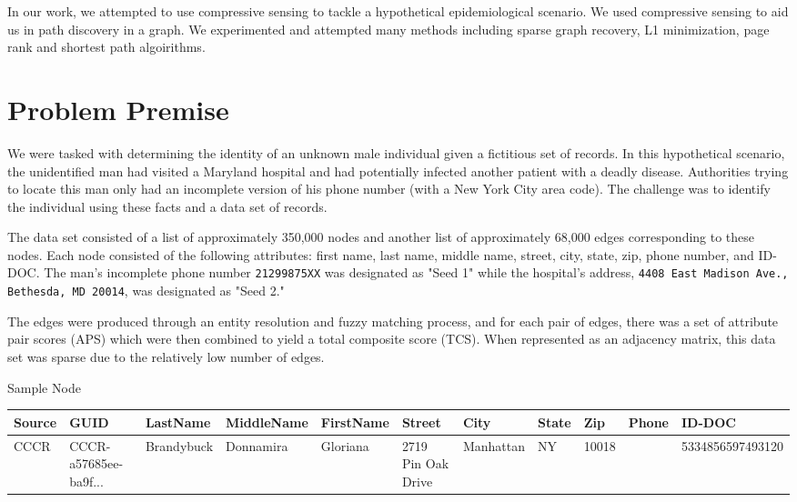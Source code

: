 \documentclass{article} %
\begin{document}
In our work, we attempted to use compressive sensing to tackle a hypothetical epidemiological scenario. We used compressive sensing to aid us in path discovery in a graph. We experimented and attempted many methods including sparse graph recovery, L1 minimization, page rank and shortest path algoirithms.


\section{Problem Premise}




We were tasked with determining the identity of an unknown male individual given a fictitious set of records. In this hypothetical scenario, the unidentified man had visited a Maryland hospital and had potentially infected another patient with a deadly disease. Authorities trying to locate this man only had an incomplete version of his phone number (with a New York City area code). The challenge was to identify the individual using these facts and a data set of records. 




The data set consisted of a list of approximately 350,000 nodes and another list of approximately 68,000 edges corresponding to these nodes. Each node consisted of the following attributes: first name, last name, middle name, street, city, state, zip, phone number, and ID-DOC. The man's incomplete phone number \texttt{21299875XX} was designated as "Seed 1" while the hospital's address, \texttt{4408 East Madison Ave., Bethesda, MD 20014}, was designated as "Seed 2."




The edges were produced through an entity resolution and fuzzy matching process, and for each pair of edges, there was a set of attribute pair scores (APS) which were then combined to yield a total composite score (TCS). When represented as an adjacency matrix, this data set was sparse due to the relatively low number of edges.




Sample Node


\begin{table}[h]
\centering
\tiny
\begin{tabular}{|l|l|l|l|l|l|l|l|l|l|l|}
\hline
\textbf{Source} & \textbf{GUID} & \textbf{LastName} & \textbf{MiddleName} & \textbf{FirstName} & \textbf{Street} & \textbf{City} & \textbf{State} & \textbf{Zip} & \textbf{Phone} & \textbf{ID-DOC} \\ \hline
CCCR & CCCR-a57685ee-ba9f... & Brandybuck & Donnamira & Gloriana & 2719 Pin Oak Drive & Manhattan & NY & 10018 &  & 5334856597493120 \\ \hline
\end{tabular}
\end{table}
\end{document}
